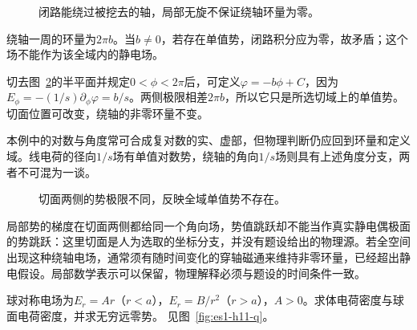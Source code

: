\begin{figure}[H]\centering
{}
\caption{闭路能绕过被挖去的轴，局部无旋不保证绕轴环量为零。}\label{fig:es1-h10-q}
\end{figure}
\begin{solution}
绕轴一周的环量为$2\pi b$。当$b\ne0$，若存在单值势，闭路积分应为零，故矛盾；这个场不能作为该全域内的静电场。

切去图~\ref{fig:es1-h10-s}的半平面并规定$0<\phi<2\pi$后，可定义$\varphi=-b\phi+C$，因为$E_\phi=-(1/s)\partial_\phi\varphi=b/s$。两侧极限相差$2\pi b$，所以它只是所选切域上的单值势。切面位置可改变，绕轴的非零环量不变。

本例中的对数与角度常可合成复对数的实、虚部，但物理判断仍应回到环量和定义域。线电荷的径向$1/s$场有单值对数势，绕轴的角向$1/s$场则具有上述角度分支，两者不可混为一谈。
\begin{figure}[H]\centering
{}
\caption{切面两侧的势极限不同，反映全域单值势不存在。}\label{fig:es1-h10-s}
\end{figure}


局部势的梯度在切面两侧都给同一个角向场，势值跳跃却不能当作真实静电偶极面的势跳跃：这里切面是人为选取的坐标分支，并没有题设给出的物理源。若全空间出现这种绕轴电场，通常须有随时间变化的穿轴磁通来维持非零环量，已经超出静电假设。局部数学表示可以保留，物理解释必须与题设的时间条件一致。
\end{solution}

\begin{exercise}[从场反求电荷]\label{ex:es1-h11}
球对称电场为$E_r=Ar$（$r<a$），$E_r=B/r^2$（$r>a$），$A>0$。求体电荷密度与球面电荷密度，并求无穷远零势。 见图~\ref{fig:es1-h11-q}。
\end{exercise}

